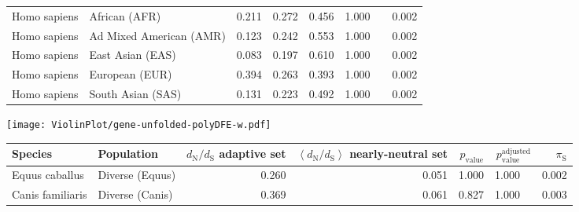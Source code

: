 \begin{center}
\begin{adjustbox}{width = 1\textwidth}
\begin{tabular}{|l|l|r|r|r|r|r|}
        Homo sapiens &                   African (AFR) &                                              0.211 &                                              0.272 &                0.456 &                                  1.000~~ &              0.002 \\
        Homo sapiens &         Ad Mixed American (AMR) &                                              0.123 &                                              0.242 &                0.553 &                                  1.000~~ &              0.002 \\
        Homo sapiens &                East Asian (EAS) &                                              0.083 &                                              0.197 &                0.610 &                                  1.000~~ &              0.002 \\
        Homo sapiens &                  European (EUR) &                                              0.394 &                                              0.263 &                0.393 &                                  1.000~~ &              0.002 \\
        Homo sapiens &               South Asian (SAS) &                                              0.131 &                                              0.223 &                0.492 &                                  1.000~~ &              0.002 \\
\bottomrule
\end{tabular}
\end{adjustbox}
\newpage
\texttt{[image: ViolinPlot/gene-unfolded-polyDFE-w.pdf]} 
\begin{adjustbox}{width = 1\textwidth}
\begin{tabular}{|l|l|r|r|r|r|r|}
\toprule
             Species &                      Population & \specialcell{$d_{\mathrm{N}} / d_{\mathrm{S}}$ \\ adaptive set} & \specialcell{$\left< d_{\mathrm{N}} / d_{\mathrm{S}} \right>$ \\ nearly-neutral set} & $p_{\mathrm{value}}$ & $p_{\mathrm{value}}^{\mathrm{adjusted}}$ & $\pi_{\textrm{S}}$ \\
\midrule
      Equus caballus &                 Diverse (Equus) &                                              0.260 &                                              0.051 &                1.000 &                                  1.000~~ &              0.002 \\
    Canis familiaris &                 Diverse (Canis) &                                              0.369 &                                              0.061 &                0.827 &                                  1.000~~ &              0.003 \\

\end{tabular}
\end{adjustbox}
\end{center}
